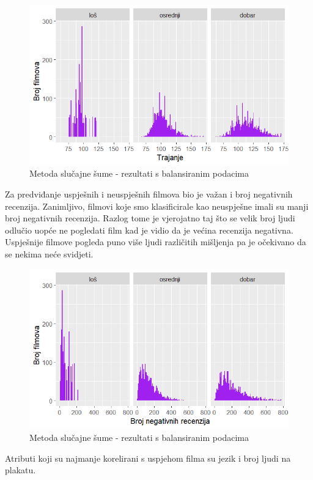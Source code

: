 \begin{figure}[H]
	\centering
	\includegraphics[width=15cm]{../figures/expl/007.png}
	\caption{Metoda slučajne šume - rezultati s balansiranim podacima}
	\label{fig:ml7}
\end{figure}

Za predviđanje uspješnih i neuspješnih filmova bio je važan i broj negativnih recenzija. Zanimljivo, filmovi koje smo klasificirale kao neuspješne imali su manji broj negativnih recenzija. Razlog tome je vjerojatno taj što se velik broj ljudi odlučio uopće ne pogledati film kad je vidio da je većina recenzija negativna. Uspješnije filmove pogleda puno više ljudi različitih mišljenja pa je očekivano da se nekima neće svidjeti.

\begin{figure}[H]
	\centering
	\includegraphics[width=15cm]{../figures/expl/008.png}
	\caption{Metoda slučajne šume - rezultati s balansiranim podacima}
	\label{fig:ml8}
\end{figure}

Atributi koji su najmanje korelirani s uspjehom filma su jezik i broj ljudi na plakatu.

\eject